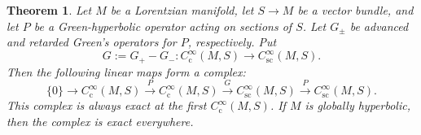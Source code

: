 \documentclass[a4paper,11pt]{amsart}
\newtheorem{thm}{Theorem}[section]
\theoremstyle{definition}
\begin{document}
\begin{thm}\label{pexactseq}
Let $M$ be a Lorentzian manifold, let $S\to M$ be a vector bundle, and let $P$ be a Green-hyperbolic operator acting on sections of $S$.
Let $G_\pm$ be advanced and retarded Green's operators for $P$, respectively.
Put 
$$
G:=G_+-G_-: {C^\infty_\mathrm{c}}(M,S) \to {C^\infty_\mathrm{sc}}(M,S).
$$
Then the following linear maps form a complex:
\begin{equation}\label{exactseq}
 \{0\}\to{C^\infty_\mathrm{c}}(M,S)\xrightarrow{P}{C^\infty_\mathrm{c}}(M,S)\xrightarrow{G}{C^\infty_\mathrm{sc}}(M,S)\xrightarrow{P}{C^\infty_\mathrm{sc}}(M,S).
\end{equation}
This complex is always exact at the first ${C^\infty_\mathrm{c}}(M,S)$.
If $M$ is globally hyperbolic, then the complex is exact everywhere.
\end{thm}
\end{document}
